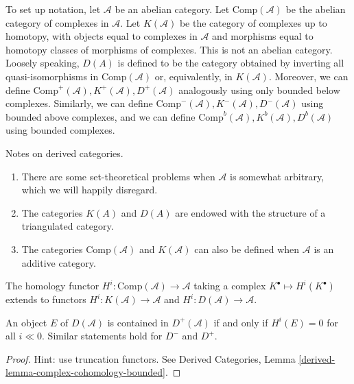\noindent
To set up notation, let $\mathcal{A}$ be an abelian category. Let
$\text{Comp}(\mathcal{A})$ be the abelian category of complexes in
$\mathcal{A}$. Let $K(\mathcal{A})$ be the category of complexes up to
homotopy, with objects equal to complexes in $\mathcal{A}$ and morphisms
equal to
homotopy classes of morphisms of complexes. This is not an abelian category.
Loosely speaking, $D(A)$ is defined to be the category obtained by inverting
all quasi-isomorphisms in $\text{Comp}(\mathcal{A})$ or, equivalently, in
$K(\mathcal{A})$. Moreover, we can define $\text{Comp}^+(\mathcal{A}),
K^+(\mathcal{A}), D^+(\mathcal{A})$ analogously using only bounded below
complexes. Similarly, we can define $\text{Comp}^-(\mathcal{A}),
K^-(\mathcal{A}), D^-(\mathcal{A})$ using bounded above complexes, and we can
define $\text{Comp}^b(\mathcal{A}), K^b(\mathcal{A}), D^b(\mathcal{A})$ using
bounded complexes.

\begin{remark}
\label{remarks-derived-categories}
Notes on derived categories.
\begin{enumerate}
\item
There are some set-theoretical problems when $\mathcal{A}$ is somewhat
arbitrary, which we will happily disregard.
\item
The categories $K(A)$ and $D(A)$ are endowed with the structure of a
triangulated category.
\item
The categories $\text{Comp}(\mathcal{A})$ and $K(\mathcal{A})$ can also be
defined when $\mathcal{A}$ is an additive category.
\end{enumerate}
\end{remark}

\noindent
The homology functor $H^i : \text{Comp}(\mathcal{A}) \to \mathcal{A}$ taking a
complex $K^\bullet \mapsto H^i(K^\bullet)$ extends to functors $H^i :
K(\mathcal{A}) \to \mathcal{A}$ and $H^i : D(\mathcal{A}) \to \mathcal{A}$.

\begin{lemma}
\label{lemma-when-in-bounded}
An object $E$ of $D(\mathcal{A})$ is contained in $D^+(\mathcal{A})$ if and
only if $H^i(E) =0 $ for all $i \ll 0$. Similar statements hold for $D^-$ and
$D^+$.
\end{lemma}

\begin{proof}
Hint: use truncation functors. See
Derived Categories, Lemma \ref{derived-lemma-complex-cohomology-bounded}.
\end{proof}

